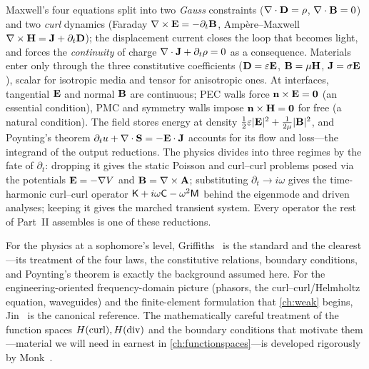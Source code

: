 \summarysection
Maxwell's four equations split into two \emph{Gauss} constraints
($\nabla\cdot\mathbf{D}=\rho$, $\nabla\cdot\mathbf{B}=0$) and two \emph{curl} dynamics (Faraday
$\nabla\times\mathbf{E}=-\partial_t\mathbf{B}$, Amp\`ere--Maxwell $\nabla\times\mathbf{H}=\mathbf{J}+\partial_t\mathbf{D}$); the
displacement current closes the loop that becomes light, and forces the
\emph{continuity} of charge $\nabla\cdot\mathbf{J}+\partial_t\rho=0$ as a consequence.
Materials enter only through the three constitutive coefficients
($\mathbf{D}=\varepsilon\mathbf{E}$, $\mathbf{B}=\mu\mathbf{H}$, $\mathbf{J}=\sigma\mathbf{E}$), scalar for isotropic
media and tensor for anisotropic ones. At interfaces, tangential $\mathbf{E}$ and
normal $\mathbf{B}$ are continuous; PEC walls force $\mathbf{n}\times\mathbf{E}=\bm0$ (an essential
condition), PMC and symmetry walls impose $\mathbf{n}\times\mathbf{H}=\bm0$ for free (a
natural condition). The field stores energy at density
$\tfrac12\varepsilon\lvert\mathbf{E}\rvert^2+\tfrac1{2\mu}\lvert\mathbf{B}\rvert^2$, and Poynting's
theorem $\partial_t u+\nabla\cdot\mathbf{S}=-\mathbf{E}\cdot\mathbf{J}$ accounts for its flow and loss---the
integrand of the output reductions. The physics divides into three regimes by
the fate of $\partial_t$: dropping it gives the static Poisson and curl--curl
problems posed via the potentials $\mathbf{E}=-\nabla V$ and $\mathbf{B}=\nabla\times\mathbf{A}$;
substituting $\partial_t\to i\omega$ gives the time-harmonic curl--curl operator
$\mathsf{K}+i\omega\mathsf{C}-\omega^2\mathsf{M}$ behind the eigenmode and driven analyses;
keeping it gives the marched transient system. Every operator the rest of
Part~II assembles is one of these reductions.

\furtherreading
For the physics at a sophomore's level, Griffiths~\citep{griffiths2017} is the
standard and the clearest---its treatment of the four laws, the constitutive
relations, boundary conditions, and Poynting's theorem is exactly the
background assumed here. For the engineering-oriented frequency-domain picture
(phasors, the curl--curl/Helmholtz equation, waveguides) and the finite-element
formulation that \cref{ch:weak} begins, Jin~\citep{jin2014} is the canonical
reference. The mathematically careful treatment of the function spaces
$H(\mathrm{curl}),H(\mathrm{div})$ and the boundary conditions that motivate them---material we
will need in earnest in \cref{ch:functionspaces}---is developed rigorously by
Monk~\citep{monk2003}.

